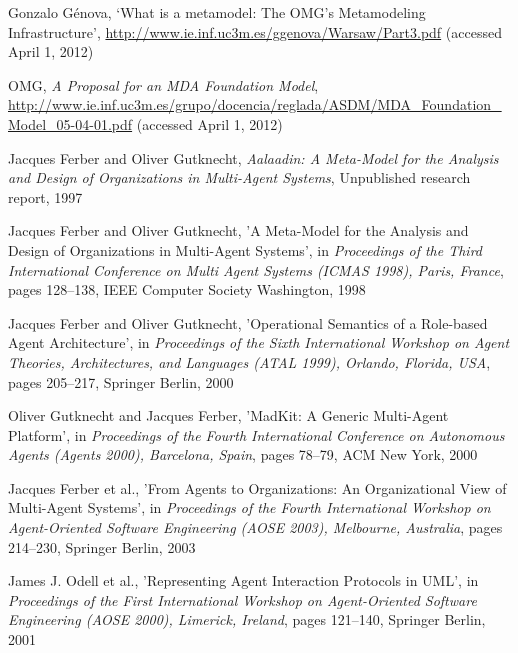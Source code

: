 \begin{thebibliography}{99}
Gonzalo Génova,
`What is a metamodel: The OMG’s Metamodeling Infrastructure',
\url{http://www.ie.inf.uc3m.es/ggenova/Warsaw/Part3.pdf} (accessed April 1, 2012)

OMG,
\textit{A Proposal for an MDA Foundation Model},
\url{http://www.ie.inf.uc3m.es/grupo/docencia/reglada/ASDM/MDA_Foundation_Model_05-04-01.pdf} (accessed April 1, 2012)


Jacques Ferber and Oliver Gutknecht,
\textit{Aalaadin: A Meta-Model for the Analysis and Design of Organizations in Multi-Agent Systems},
Unpublished research report, 1997

Jacques Ferber and Oliver Gutknecht,
'A Meta-Model for the Analysis and Design of Organizations in Multi-Agent Systems',
in \textit{Proceedings of the Third International Conference on Multi Agent Systems (ICMAS 1998), Paris, France},
pages 128--138,
IEEE Computer Society Washington, 1998

Jacques Ferber and Oliver Gutknecht,
'Operational Semantics of a Role-based Agent Architecture',
in \textit{Proceedings of the Sixth International Workshop on Agent Theories, Architectures, and Languages (ATAL 1999), Orlando, Florida, USA},
pages 205--217,
Springer Berlin, 2000

Oliver Gutknecht and Jacques Ferber,
'MadKit: A Generic Multi-Agent Platform',
in \textit{Proceedings of the Fourth International Conference on Autonomous Agents (Agents 2000), Barcelona, Spain},
pages 78--79,
ACM New York, 2000

Jacques Ferber et al., %
'From Agents to Organizations: An Organizational View of Multi-Agent Systems',
in \textit{Proceedings of the Fourth International Workshop on Agent-Oriented Software Engineering (AOSE 2003), Melbourne, Australia},
pages 214--230,
Springer Berlin, 2003


James J. Odell et al., %
'Representing Agent Interaction Protocols in UML',
in \textit{Proceedings of the First International Workshop on Agent-Oriented Software Engineering (AOSE 2000), Limerick, Ireland},
pages 121--140,
Springer Berlin, 2001


\end{thebibliography}

